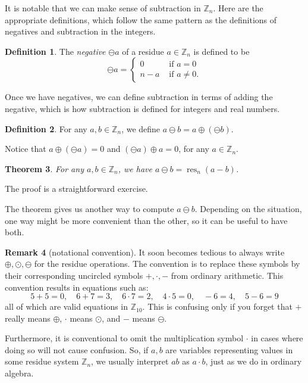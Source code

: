 \documentclass[11pt]{article}
\newtheorem{thm}{Theorem}[section]
\theoremstyle{definition}
\newtheorem{defn}[thm]{Definition}
\newtheorem{rmk}[thm]{Remark}
\newcommand{\Z}{\mathbb{Z}} %
\newcommand{\res}{\operatorname{res}}
\begin{document}
It is notable that we can make sense of subtraction in $\Z_n$. Here
are the appropriate definitions, which follow the same pattern as the
definitions of negatives and subtraction in the integers.

\begin{defn}
  The \emph{negative} $\ominus a$ of a residue $a \in \Z_n$ is defined to be
  \[
  \ominus a = 
  \begin{cases}
    0 & \text{ if } a = 0 \\
    n-a & \text{ if } a \ne 0.
  \end{cases}
  \]
\end{defn}

Once we have negatives, we can define subtraction in terms of adding
the negative, which is how subtraction is defined for integers and
real numbers.

\begin{defn}
  For any $a,b \in \Z_n$, we define $a \ominus b = a \oplus (\ominus b)$. 
\end{defn}

Notice that $a \oplus ( \ominus a) = 0$ and $(\ominus a) \oplus a =
0$, for any $a \in \Z_n$.


\begin{thm}\label{thm:ressub}
   For any $a,b \in \Z_n$, we have $a \ominus b = \res_n(a-b)$. 
\end{thm}

The proof is a straightforward exercise.

The theorem gives us another way to compute $a \ominus b$. Depending
on the situation, one way might be more convenient than the other, so
it can be useful to have both.

\begin{rmk}[notational convention]
  It soon becomes tedious to always write $\oplus, \odot, \ominus$ for
  the residue operations. The convention is to replace these symbols
  by their corresponding uncircled symbols $+, \cdot, -$ from ordinary
  arithmetic. This convention results in equations such as:
  \[
    5+5 = 0,\quad 6+7 = 3,\quad 6 \cdot 7 = 2,\quad 4 \cdot 5 = 0,
    \quad -6 = 4,\quad 5-6 = 9
  \]
  all of which are valid equations in $\Z_{10}$. This is confusing
  only if you forget that $+$ really means $\oplus$, $\cdot$ means $\odot$,
  and $-$ means $\ominus$.  

  Furthermore, it is conventional to omit the multiplication symbol
  $\cdot$ in cases where doing so will not cause confusion. So, if
  $a,b$ are variables representing values in some residue system
  $\Z_n$, we usually interpret $ab$ as $a \cdot b$, just as we do in
  ordinary algebra.
\end{rmk}
\end{document}
